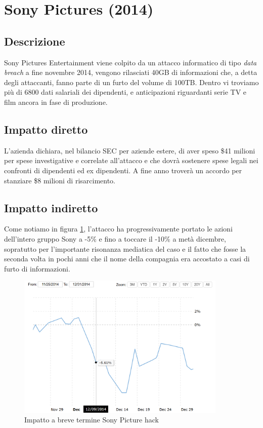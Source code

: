 \documentclass[12pt,a4paper,openright,twoside]{report}
\begin{document}
\section{Sony Pictures (2014)}

\subsection{Descrizione}
Sony Pictures Entertainment viene colpito da un attacco informatico di tipo \textit{data breach} a fine novembre 2014, vengono rilasciati 40GB di informazioni che, a detta degli attaccanti, fanno parte di un furto del volume di 100TB. Dentro vi troviamo pi\`u di 6800 dati salariali dei dipendenti, e anticipazioni riguardanti serie TV e film ancora in fase di produzione\cite{SonyPic_buzzfeed}.\\
\subsection{Impatto diretto}
L'azienda dichiara, nel bilancio SEC per aziende estere, di aver speso \$41 milioni per spese investigative e correlate all'attacco e che dovr\`a sostenere spese legali nei confronti di dipendenti ed ex dipendenti\cite{SonyPic_20F_report}. A fine anno trover\`a un accordo per stanziare \$8 milioni di risarcimento.\\

\subsection{Impatto indiretto}
Come notiamo in figura \ref{fig:sPic1}, l'attacco ha progressivamente portato le azioni dell'intero gruppo Sony a -5\% e fino a toccare il -10\% a met\`a dicembre, sopratutto per l'importante risonanza mediatica del caso e il fatto che fosse la seconda volta in pochi anni che il nome della compagnia era accostato a casi di furto di informazioni.\\
\begin{figure}[H] 
\begin{center} 
\includegraphics[width=10cm]{figures/sony_2014_short.png} 
\caption[Grafico Sony Pic short]{Impatto a breve termine Sony Picture hack}\label{fig:sPic1}
\end{center}
\end{figure}
\end{document}
